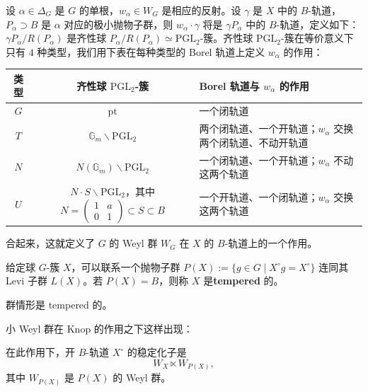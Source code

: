 \begin{defn}
[$W_G$ 在 $X$ 的 $B$-轨道上的作用]
设 $\alpha\in\Delta_G$ 是 $G$ 的单根，$w_\alpha\in W_G$ 是相应的反射。设 $\gamma$ 是 $X$ 中的 $B$-轨道，$P_\alpha\supset B$ 是 $\alpha$ 对应的极小抛物子群，则 $w_\alpha\cdot\gamma$ 将是 $\gamma P_\alpha$ 中的 $B$-轨道，定义如下：$\gamma P_\alpha/R(P_\alpha)$ 是齐性球 $P_\alpha/R(P_\alpha)\simeq\mathrm{PGL}_2$-簇。齐性球 $\mathrm{PGL}_2$-簇在等价意义下只有 $4$ 种类型，我们用下表在每种类型的 Borel 轨道上定义 $w_\alpha$ 的作用：

\smallskip
\noindent\begin{tabular}{|c|c|p{}|}
  \hline
  类型 & 齐性球 $\mathrm{PGL}_2$-簇 & Borel 轨道与 $w_\alpha$ 的作用\\
  \hline
  $G$ & $\mathrm{pt}$ & 一个闭轨道\\
  \hline
  $T$ & $\mathbb G_m\backslash\mathrm{PGL}_2$ & 两个闭轨道、一个开轨道；$w_\alpha$ 交换两个闭轨道、不动开轨道\\
  \hline
  $N$ & $N(\mathbb G_m)\backslash\mathrm{PGL}_2$ & 一个闭轨道、一个开轨道；$w_\alpha$ 不动这两个轨道\\
  \hline
  $U$ & $N\cdot S\backslash\mathrm{PGL}_2$，其中 $N=\begin{pmatrix}1&a\\0&1\end{pmatrix}\subset S\subset B$ & 一个开轨道、一个闭轨道；$w_\alpha$ 交换这两个轨道\\
  \hline
\end{tabular}
\smallskip

合起来，这就定义了 $G$ 的 Weyl 群 $W_G$ 在 $X$ 的 $B$-轨道上的一个作用。
\end{defn}

\begin{defn}
给定球 $G$-簇 $X$，可以联系一个抛物子群 $P(X):=\{g\in G\mid X^\circ g=X^\circ\}$ 连同其 Levi 子群 $L(X)$。若 $P(X)=B$，则称 $X$ 是\textbf{tempered} 的。
\end{defn}

\begin{exmp}
[tempered 性]
群情形是 tempered 的。
\end{exmp}

小 Weyl 群在 Knop 的作用之下这样出现：

\begin{prop}
[Knop]
在此作用下，开 $B$-轨道 $X^\circ$ 的稳定化子是
\[
  W_X\ltimes W_{P(X)},
\]
其中 $W_{P(X)}$ 是 $P(X)$ 的 Weyl 群。
\end{prop}

